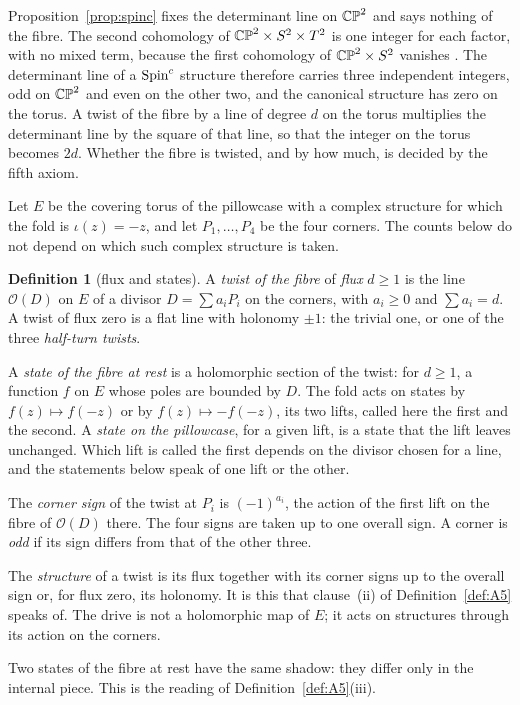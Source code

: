 \documentclass[11pt,a4paper]{article}
\theoremstyle{plain}
\theoremstyle{definition}
\newtheorem{definition}[theorem]{Definition}
\theoremstyle{remark}
\begin{document}
Proposition~\ref{prop:spinc} fixes the determinant line on $\mathbb{CP}^2$ and says nothing of the fibre. The second cohomology of $\mathbb{CP}^2\times S^2\times T^2$ is one integer for each factor, with no mixed term, because the first cohomology of $\mathbb{CP}^2\times S^2$ vanishes \cite{Hatcher}. The determinant line of a $\text{Spin}^c$ structure therefore carries three independent integers, odd on $\mathbb{CP}^2$ and even on the other two, and the canonical structure has zero on the torus. A twist of the fibre by a line of degree $d$ on the torus multiplies the determinant line by the square of that line, so that the integer on the torus becomes $2d$. Whether the fibre is twisted, and by how much, is decided by the fifth axiom.

Let $E$ be the covering torus of the pillowcase with a complex structure for which the fold is $\iota(z)=-z$, and let $P_{1},\dots,P_{4}$ be the four corners. The counts below do not depend on which such complex structure is taken.

\begin{definition}[flux and states]\label{def:states}
A \emph{twist of the fibre} of \emph{flux} $d\geq1$ is the line $\mathcal{O}(D)$ on $E$ of a divisor $D=\sum a_{i}P_{i}$ on the corners, with $a_{i}\geq0$ and $\sum a_{i}=d$. A twist of flux zero is a flat line with holonomy $\pm1$: the trivial one, or one of the three \emph{half-turn twists}.

A \emph{state of the fibre at rest} is a holomorphic section of the twist: for $d\geq1$, a function $f$ on $E$ whose poles are bounded by $D$. The fold acts on states by $f(z)\mapsto f(-z)$ or by $f(z)\mapsto-f(-z)$, its two lifts, called here the first and the second. A \emph{state on the pillowcase}, for a given lift, is a state that the lift leaves unchanged. Which lift is called the first depends on the divisor chosen for a line, and the statements below speak of one lift or the other.

The \emph{corner sign} of the twist at $P_{i}$ is $(-1)^{a_{i}}$, the action of the first lift on the fibre of $\mathcal{O}(D)$ there. The four signs are taken up to one overall sign. A corner is \emph{odd} if its sign differs from that of the other three.

The \emph{structure} of a twist is its flux together with its corner signs up to the overall sign or, for flux zero, its holonomy. It is this that clause~(ii) of Definition~\ref{def:A5} speaks of. The drive is not a holomorphic map of $E$; it acts on structures through its action on the corners.

Two states of the fibre at rest have the same shadow: they differ only in the internal piece. This is the reading of Definition~\ref{def:A5}(iii).
\end{definition}
\end{document}
